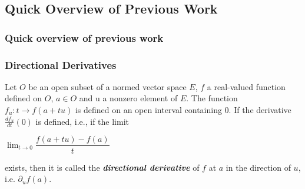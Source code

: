 \documentclass{beamer}
\begin{document}
\subsection{Quick Overview of Previous Work}
\begin{frame}
\frametitle{Quick overview of previous work}




\end{frame}


\begin{frame}
\frametitle{Directional Derivatives}
Let $O$ be an open subset of a normed vector space $E$, $f$ a real-valued function
defined on $O$, $a \in O$ and u a nonzero element of $E$. The function $f_{u}:t\rightarrow f(a +tu)$ is defined on an open interval containing 0. If the derivative $\frac{df_{u}}{dt}(0)$ is defined, i.e., if the limit
\begin{center}
$\lim_{t\to 0} \dfrac{f(a+tu)-f(a)}{t}$
\end{center}
exists, then it is called the \textbf{\textit{directional derivative}} of $f$ at $a$ in the direction of $u$, i.e. $\partial_{u}f(a)$.\\~\\
\end{frame}
\end{document}
